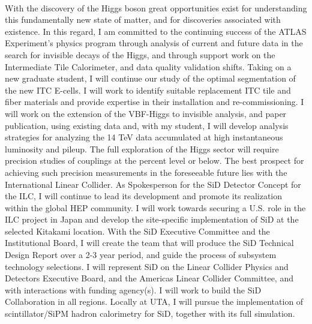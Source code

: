 \vspace*{0.1in}
 \\
With the discovery of the Higgs boson great opportunities exist for understanding this
fundamentally new state of matter, and for discoveries associated with existence. In this regard,
I am committed to the continuing success of the ATLAS Experiment's physics program through analysis of current 
and future data in the search for invisible decays of the Higgs, and through support work on the
Intermediate Tile Calorimeter, and data quality validation shifts. Taking on a new graduate student,
I will continue our study of the optimal segmentation of the new ITC E-cells. I will work to identify suitable 
replacement ITC tile and fiber materials and provide expertise in their
installation and re-commissioning. I will work on the extension of the VBF-Higgs to invisible analysis, and 
paper publication, using existing data and, with my student, I will develop analysis strategies 
for analyzing the 14 TeV data accumulated at high instantaneous luminosity and pileup.
The full exploration of the Higgs sector will require precision studies of couplings at the percent level or below.
The best prospect for achieving such precision measurements in the foreseeable future lies with the International
Linear Collider. As Spokesperson for the SiD Detector Concept for the ILC, I will continue to lead its
development and promote its realization within the global HEP community. I will work towards securing a U.S. role
in the ILC project in Japan and develop the site-specific implementation of SiD at the selected Kitakami location.
With the SiD Executive Committee and the Institutional Board, I will create the team that will produce the SiD
Technical Design Report over a 2-3 year period, and guide the process of subsystem technology selections. 
I will represent SiD on the Linear Collider Physics and Detectors Executive Board, and the Americas Linear Collider Committee, and with interactions 
with funding agency(s). I will work to build the SiD Collaboration in all regions. Locally at UTA, I will pursue the
implementation of scintillator/SiPM hadron calorimetry for SiD, together with its full simulation.
